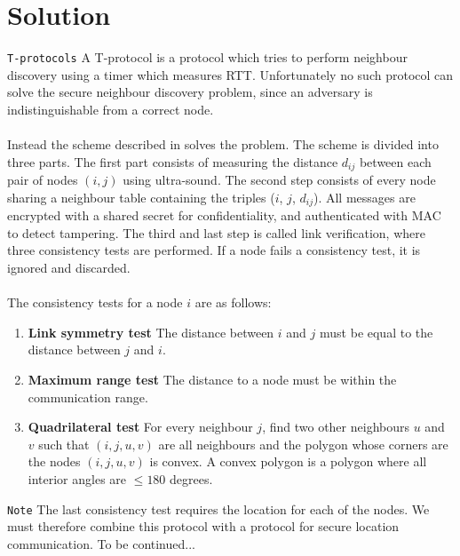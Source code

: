 \documentclass{article}
\begin{document}
\section{Solution}
\verb!T-protocols! A T-protocol is a protocol which tries to perform neighbour discovery using a timer which measures RTT. Unfortunately no such protocol can solve the secure neighbour discovery problem, since an adversary is indistinguishable from a correct node\cite{poturalski2013}.
\\
\\
Instead the scheme described in \cite{ShokriPRPH:C:09} solves the problem. The scheme is divided into three parts. The first part consists of measuring the distance $d_{ij}$ between each pair of nodes $(i, j)$ using ultra-sound. The second step consists of every node sharing a neighbour table containing the triples ($i$, $j$, $d_{ij}$). All messages are encrypted with a shared secret for confidentiality, and authenticated with MAC to detect tampering. The third and last step is called link verification, where three consistency tests are performed. If a node fails a consistency test, it is ignored and discarded.
\\
\\
The consistency tests for a node $i$ are as follows:
\begin{enumerate}
    \item \textbf{Link symmetry test} The distance between $i$ and $j$ must be equal to the distance between $j$ and $i$.
    \item \textbf{Maximum range test} The distance to a node must be within the communication range.
    \item \textbf{Quadrilateral test} For every neighbour $j$, find two other neighbours $u$ and $v$ such that $(i, j, u, v)$ are all neighbours and the polygon whose corners are the nodes $(i, j, u, v)$ is convex. A convex polygon is a polygon where all interior angles are $\le 180$ degrees. 
\end{enumerate}
\verb!Note! The last consistency test requires the location for each of the nodes. We must therefore combine this protocol with a protocol for secure location communication. To be continued...
\clearpage


\end{document}
